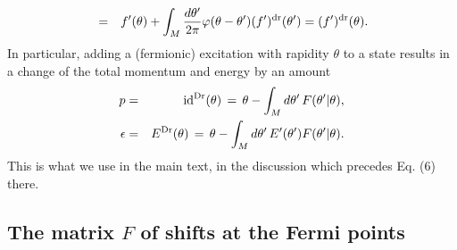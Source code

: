 \documentclass[twocolumn,amsfonts,showpacs,superscriptaddress]{revtex4-1}
\begin{document}
\begin{widetext}
\begin{eqnarray}
& = & f'(\theta)  + \int_M \frac{d\theta'}{2\pi}  \varphi( \theta- \theta') (f')^{\rm dr}(\theta')   
=	(f')^{\rm dr}(\theta) .
\end{eqnarray}
In particular, adding a (fermionic) excitation with rapidity $\theta$ to a state results in a change of the total momentum and energy by an amount
\begin{eqnarray}
	\label{sm:eq:k}
	p  &=&  {\rm id}^{\rm Dr} (\theta) \, = \, \theta - \int_M d\theta' \, F(\theta' | \theta) ,\\
	\epsilon  &=&  E^{\rm Dr} (\theta) \, = \, \theta - \int_M d\theta' \, E'(\theta')  F(\theta' | \theta) \nonumber.
\end{eqnarray}
This is what we use in the main text, in the discussion which precedes Eq. (6) there.

\subsection{The matrix $F$ of shifts at the Fermi points}\label{SectFs}


\end{widetext}
\end{document}
